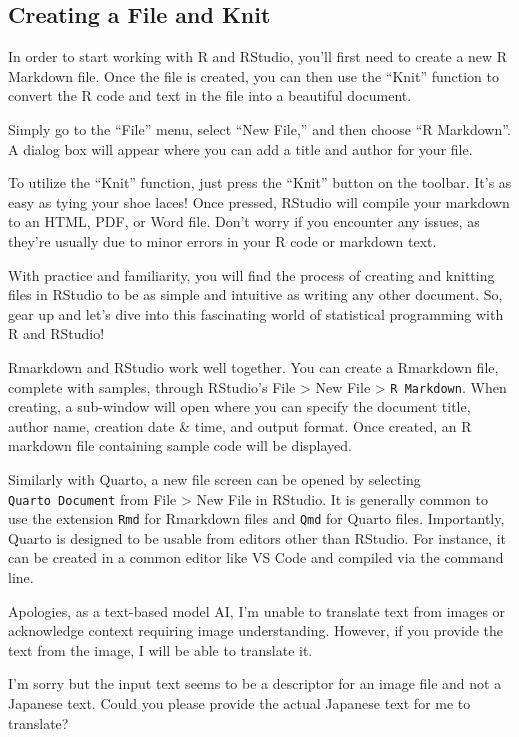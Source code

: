 \documentclass[
  a4paper,
]{book}
\begin{document}
\subsection{Creating a File and Knit}\label{creating-a-file-and-knit}

In order to start working with R and RStudio, you'll first need to
create a new R Markdown file. Once the file is created, you can then use
the ``Knit'' function to convert the R code and text in the file into a
beautiful document.

Simply go to the ``File'' menu, select ``New File,'' and then choose ``R
Markdown''. A dialog box will appear where you can add a title and
author for your file.

To utilize the ``Knit'' function, just press the ``Knit'' button on the
toolbar. It's as easy as tying your shoe laces! Once pressed, RStudio
will compile your markdown to an HTML, PDF, or Word file. Don't worry if
you encounter any issues, as they're usually due to minor errors in your
R code or markdown text.

With practice and familiarity, you will find the process of creating and
knitting files in RStudio to be as simple and intuitive as writing any
other document. So, gear up and let's dive into this fascinating world
of statistical programming with R and RStudio!

Rmarkdown and RStudio work well together. You can create a Rmarkdown
file, complete with samples, through RStudio's File \textgreater{} New
File \textgreater{} \texttt{R\ Markdown}. When creating, a sub-window
will open where you can specify the document title, author name,
creation date \& time, and output format. Once created, an R markdown
file containing sample code will be displayed.

Similarly with Quarto, a new file screen can be opened by selecting
\texttt{Quarto\ Document} from File \textgreater{} New File in RStudio.
It is generally common to use the extension \texttt{Rmd} for Rmarkdown
files and \texttt{Qmd} for Quarto files. Importantly, Quarto is designed
to be usable from editors other than RStudio. For instance, it can be
created in a common editor like VS Code and compiled via the command
line.

Apologies, as a text-based model AI, I'm unable to translate text from
images or acknowledge context requiring image understanding. However, if
you provide the text from the image, I will be able to translate it.

I'm sorry but the input text seems to be a descriptor for an image file
and not a Japanese text. Could you please provide the actual Japanese
text for me to translate?
\end{document}
